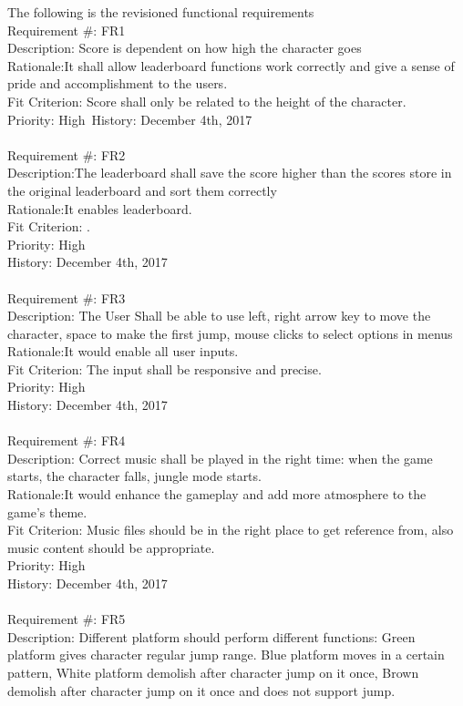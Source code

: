 \documentclass[12pt, titlepage]{article}
\newcommand{\rev}[1]{\textcolor{RevisionColour}{#1}}
\begin{document}
\rev{The following is the revisioned functional requirements\\
Requirement \#: FR1\\
Description: Score is dependent on how high the character goes\\
Rationale:It shall allow leaderboard functions work correctly and give a sense of pride and accomplishment to the users.\\
Fit Criterion: Score shall only be related to the height of the character.\\
Priority: High\
History: December 4th, 2017\\\\
Requirement \#: FR2\\
Description:The leaderboard shall save the score higher than the scores store in the original leaderboard and sort them correctly\\
Rationale:It enables leaderboard.\\
Fit Criterion: .\\
Priority: High\\
History: December 4th, 2017\\\\
Requirement \#: FR3\\
Description: The User Shall be able to use left, right arrow key to move the character, space to make the first jump, mouse clicks to select options in menus\\
Rationale:It would enable all user inputs.\\
Fit Criterion: The input shall be responsive and precise.\\
Priority: High\\
History: December 4th, 2017\\\\
Requirement \#: FR4\\
Description: Correct music shall be played in the right time: when the game starts, the character falls, jungle mode starts.\\
Rationale:It would enhance the gameplay and add more atmosphere to the game's theme.\\
Fit Criterion: Music files should be in the right place to get reference from, also music content should be appropriate.\\
Priority: High\\
History: December 4th, 2017\\\\
Requirement \#: FR5\\
Description: Different platform should perform different functions: Green platform gives character regular jump range. Blue platform moves in a certain pattern, White platform demolish after character jump on it once, Brown demolish after character jump on it once and does not support jump.\\
}
\end{document}

